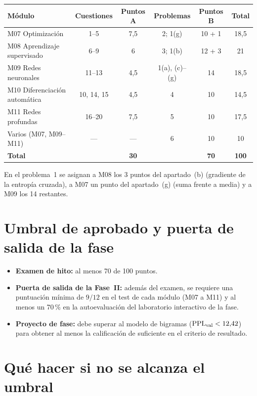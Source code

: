 \begin{center}
\small
\begin{tabular}{@{}lccccc@{}}
\toprule
Módulo & Cuestiones & Puntos A & Problemas & Puntos B & Total \\
\midrule
M07 Optimización & 1--5 & 7,5 & 2; 1(g) & 10 + 1 & 18,5 \\
M08 Aprendizaje supervisado & 6--9 & 6 & 3; 1(b) & 12 + 3 & 21 \\
M09 Redes neuronales & 11--13 & 4,5 & 1(a), (c)--(g) & 14 & 18,5 \\
M10 Diferenciación automática & 10, 14, 15 & 4,5 & 4 & 10 & 14,5 \\
M11 Redes profundas & 16--20 & 7,5 & 5 & 10 & 17,5 \\
Varios (M07, M09--M11) & --- & --- & 6 & 10 & 10 \\
\midrule
\textbf{Total} & & \textbf{30} & & \textbf{70} & \textbf{100} \\
\bottomrule
\end{tabular}
\end{center}

En el problema~1 se asignan a M08 los 3 puntos del apartado~(b) (gradiente de la entropía cruzada), a M07 un punto del apartado~(g) (suma frente a media) y a M09 los 14 restantes.

\section{Umbral de aprobado y puerta de salida de la fase}

\begin{itemize}[leftmargin=1.4em]
  \item \textbf{Examen de hito:} al menos 70 de 100 puntos.
  \item \textbf{Puerta de salida de la Fase~II:} además del examen, se requiere una puntuación mínima de $9/12$ en el test de cada módulo (M07 a M11) y al menos un 70\,\% en la autoevaluación del laboratorio interactivo de la fase.
  \item \textbf{Proyecto de fase:} debe superar al modelo de bigramas ($\operatorname{PPL}_{\text{val}}<12{,}42$) para obtener al menos la calificación de suficiente en el criterio de resultado.
\end{itemize}

\section{Qué hacer si no se alcanza el umbral}

